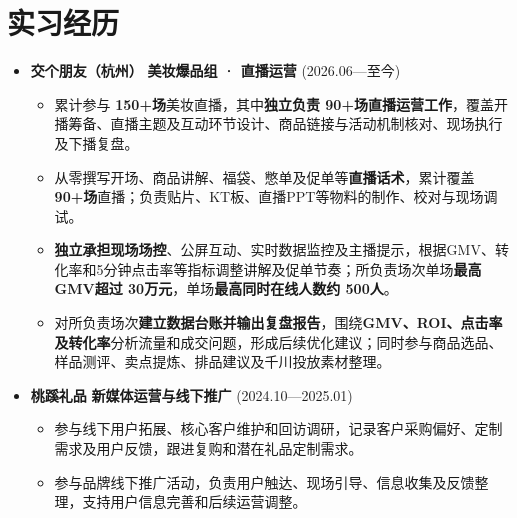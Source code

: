 \documentclass[a4paper,11pt]{article}
\begin{document}
\section*{实习经历}
\begin{itemize}[leftmargin=*,itemsep=2pt]
  \item \textbf{交个朋友（杭州）} \hfill \textbf{美妆爆品组 · 直播运营} (2026.06—至今)
  \begin{itemize}[leftmargin=*,itemsep=1pt]
    \item 累计参与 \textbf{150+场}美妆直播，其中\textbf{独立负责 90+场直播运营工作}，覆盖开播筹备、直播主题及互动环节设计、商品链接与活动机制核对、现场执行及下播复盘。
    \item 从零撰写开场、商品讲解、福袋、憋单及促单等\textbf{直播话术}，累计覆盖 \textbf{90+场}直播；负责贴片、KT板、直播PPT等物料的制作、校对与现场调试。
    \item \textbf{独立承担现场场控}、公屏互动、实时数据监控及主播提示，根据GMV、转化率和5分钟点击率等指标调整讲解及促单节奏；所负责场次单场\textbf{最高GMV超过 30万元}，单场\textbf{最高同时在线人数约 500人}。
    \item 对所负责场次\textbf{建立数据台账并输出复盘报告}，围绕\textbf{GMV、ROI、点击率及转化率}分析流量和成交问题，形成后续优化建议；同时参与商品选品、样品测评、卖点提炼、排品建议及千川投放素材整理。
  \end{itemize}
\end{itemize}
\begin{itemize}[leftmargin=*,itemsep=2pt]
  \item \textbf{桃蹊礼品} \hfill \textbf{新媒体运营与线下推广} (2024.10—2025.01)
  \begin{itemize}[leftmargin=*,itemsep=1pt]
    \item 参与线下用户拓展、核心客户维护和回访调研，记录客户采购偏好、定制需求及用户反馈，跟进复购和潜在礼品定制需求。
    \item 参与品牌线下推广活动，负责用户触达、现场引导、信息收集及反馈整理，支持用户信息完善和后续运营调整。
  \end{itemize}
\end{itemize}
\end{document}
